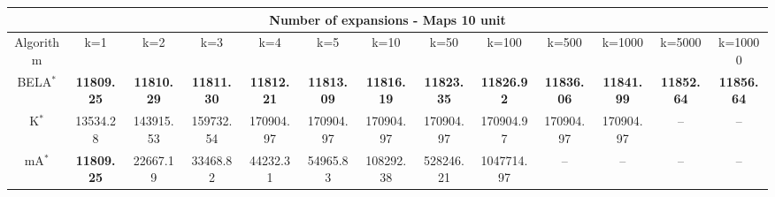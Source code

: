 \begin{tabular}{c|cccccccccccc}\toprule
\multicolumn{13}{c}{Number of expansions - Maps 10 unit}\\ \midrule
Algorithm & k=1 & k=2 & k=3 & k=4 & k=5 & k=10 & k=50 & k=100 & k=500 & k=1000 & k=5000 & k=10000 \\ \midrule
BELA$^*$ & \textbf{11809.25} & \textbf{11810.29} & \textbf{11811.30} & \textbf{11812.21} & \textbf{11813.09} & \textbf{11816.19} & \textbf{11823.35} & \textbf{11826.92} & \textbf{11836.06} & \textbf{11841.99} & \textbf{11852.64} & \textbf{11856.64} \\
K$^*$ & 13534.28 & 143915.53 & 159732.54 & 170904.97 & 170904.97 & 170904.97 & 170904.97 & 170904.97 & 170904.97 & 170904.97 & -- & -- \\
mA$^*$ & \textbf{11809.25} & 22667.19 & 33468.82 & 44232.31 & 54965.83 & 108292.38 & 528246.21 & 1047714.97 & -- & -- & -- & -- \\ \bottomrule 
\end{tabular}
